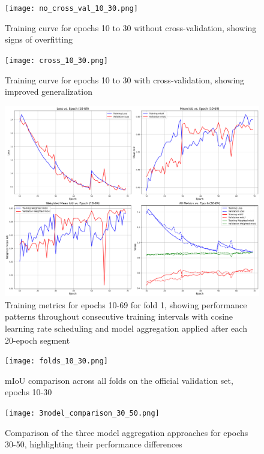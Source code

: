 \documentclass[]{article}
\begin{document}
\begin{figure}[htbp]
		\centering
		\texttt{[image: no\_cross\_val\_10\_30.png]}
		\caption{Training curve for epochs 10 to 30 without cross-validation, showing signs of overfitting}
		\label{fig:no_cross_val_10_30}
\end{figure}

\begin{figure}[htbp]
		\centering
		\texttt{[image: cross\_10\_30.png]}
		\caption{Training curve for epochs 10 to 30 with cross-validation, showing improved generalization}
		\label{fig:cross_val_10_30}
\end{figure}

\begin{figure}[htbp]
		\centering
		\includegraphics[width=1.0\textwidth]{outputs/deeplabv3plus_test_results/early_training_epochs_10_to_69.png}
		\caption{Training metrics for epochs 10-69 for fold 1, showing performance patterns throughout consecutive training intervals with cosine learning rate scheduling and model aggregation applied after each 20-epoch segment}
		\label{fig:train_metrics_10_69}
\end{figure}

\begin{figure}[htbp]
    \centering
    \texttt{[image: folds\_10\_30.png]}
    \caption{mIoU comparison across all folds on the official validation set, epochs 10-30}
    \label{fig:cross_val_10_30_val}
\end{figure}


\begin{figure}[htbp]
    \centering
    \texttt{[image: 3model\_comparison\_30\_50.png]}
    \caption{Comparison of the three model aggregation approaches for epochs 30-50, highlighting their performance differences}
    \label{fig:3model_comparison_30_50}
\end{figure}
\end{document}

